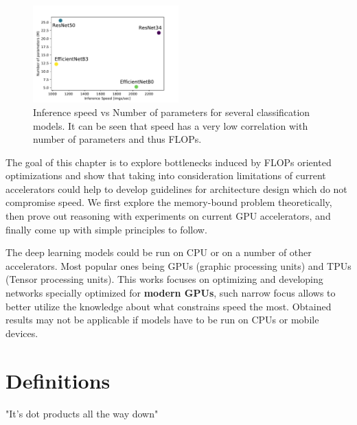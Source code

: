 \begin{figure} %
    \centering
    \includegraphics[width=0.5\textwidth]{images/fps_from_params.pdf}
    \caption{Inference speed vs Number of parameters for several classification models. It can be seen that speed has a very low correlation with number of parameters and thus FLOPs.}   \label{fig:fps_from_params}
\end{figure}

The goal of this chapter is to explore bottlenecks induced by FLOPs oriented optimizations and show that taking into consideration limitations of current accelerators could help to develop guidelines for architecture design which do not compromise speed. We first explore the memory-bound problem theoretically, then prove out reasoning with experiments on current GPU accelerators, and finally come up with simple principles to follow. 

The deep learning models could be run on CPU or on a number of other accelerators. Most popular ones being GPUs (graphic processing units) and TPUs (Tensor processing units). 
This works focuses on optimizing and developing networks specially optimized for \textbf{modern GPUs}, such narrow focus allows to better utilize the knowledge about what constrains speed the most. Obtained results may not be applicable if models have to be run on CPUs or mobile devices. %




\section{Definitions}

"It’s dot products all the way down" 

